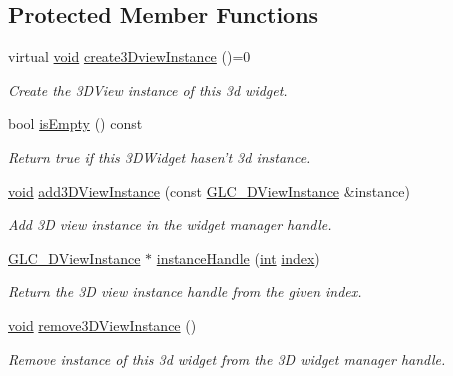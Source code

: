 \subsection*{Protected Member Functions}
\begin{DoxyCompactItemize}
\item 
virtual \hyperlink{group___u_a_v_objects_plugin_ga444cf2ff3f0ecbe028adce838d373f5c}{void} \hyperlink{class_g_l_c__3_d_widget_af077b9f297d4fdec467ef0222411501f}{create3\-Dview\-Instance} ()=0
\begin{DoxyCompactList}\small\item\em Create the 3\-D\-View instance of this 3d widget. \end{DoxyCompactList}\item 
bool \hyperlink{class_g_l_c__3_d_widget_a87248801718447ec77d2f97c1513243f}{is\-Empty} () const 
\begin{DoxyCompactList}\small\item\em Return true if this 3\-D\-Widget hasen't 3d instance. \end{DoxyCompactList}\item 
\hyperlink{group___u_a_v_objects_plugin_ga444cf2ff3f0ecbe028adce838d373f5c}{void} \hyperlink{class_g_l_c__3_d_widget_a10b27c15d26909e4aa400718f717b12e}{add3\-D\-View\-Instance} (const \hyperlink{class_g_l_c__3_d_view_instance}{G\-L\-C\-\_\-D\-View\-Instance} \&instance)
\begin{DoxyCompactList}\small\item\em Add 3\-D view instance in the widget manager handle. \end{DoxyCompactList}\item 
\hyperlink{class_g_l_c__3_d_view_instance}{G\-L\-C\-\_\-D\-View\-Instance} $\ast$ \hyperlink{class_g_l_c__3_d_widget_a16f09828f73b9a6c1fa57d40dce9760a}{instance\-Handle} (\hyperlink{ioapi_8h_a787fa3cf048117ba7123753c1e74fcd6}{int} \hyperlink{glext_8h_ab47dd9958bcadea08866b42bf358e95e}{index})
\begin{DoxyCompactList}\small\item\em Return the 3\-D view instance handle from the given index. \end{DoxyCompactList}\item 
\hyperlink{group___u_a_v_objects_plugin_ga444cf2ff3f0ecbe028adce838d373f5c}{void} \hyperlink{class_g_l_c__3_d_widget_afbcf3097444825fc566f71a7c758e93a}{remove3\-D\-View\-Instance} ()
\begin{DoxyCompactList}\small\item\em Remove instance of this 3d widget from the 3\-D widget manager handle. \end{DoxyCompactList}\item 

\end{DoxyCompactItemize}
